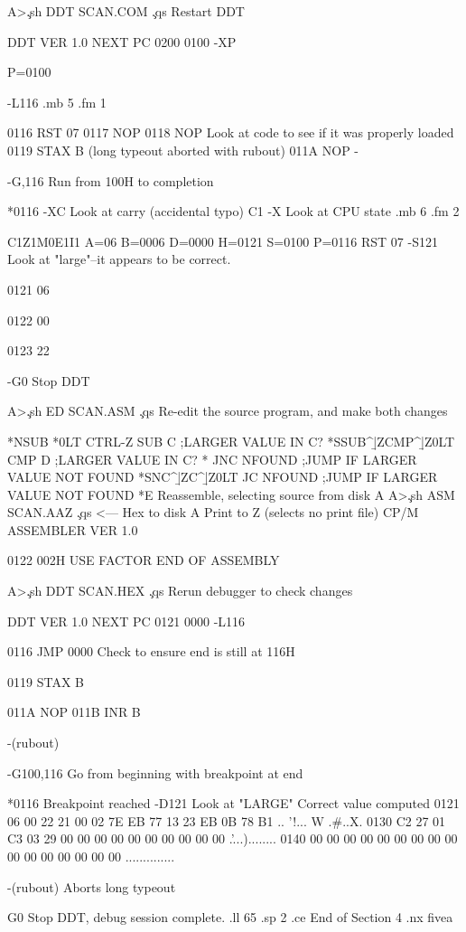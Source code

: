 A>\c
.sh
DDT SCAN.COM    \c
.qs
Restart DDT

DDT VER 1.0
NEXT PC
0200 0100
-XP

P=0100

-L116
.mb 5
.fm 1

 0116   RST        07
 0117   NOP
 0118   NOP               Look at code to see if it was properly loaded
 0119   STAX       B      (long typeout aborted with rubout)
 011A   NOP
 -

-G,116    Run from 100H to completion

*0116
-XC     Look at carry (accidental typo)
C1
-X   Look at CPU state
.mb 6
.fm 2

C1Z1M0E1I1 A=06 B=0006 D=0000 H=0121 S=0100 P=0116 RST 07
-S121   Look at "large"--it appears to be correct.

0121 06

0122 00

0123 22

-G0    Stop DDT

A>\c
.sh
ED SCAN.ASM    \c
.qs
Re-edit the source program, and make both changes

*NSUB
*0LT
     CTRL-Z        SUB     C           ;LARGER VALUE IN C?
*SSUB^\b|ZCMP^\b|Z0LT
                   CMP     D           ;LARGER VALUE IN C?
*
                   JNC     NFOUND      ;JUMP IF LARGER VALUE NOT FOUND
*SNC^\b|ZC^\b|Z0LT
                   JC      NFOUND      ;JUMP IF LARGER VALUE NOT FOUND
*E
                      Reassemble, selecting source from disk A
A>\c
.sh
ASM SCAN.AAZ   \c
.qs
<--- Hex to disk A
                      Print to Z (selects no print file)
CP/M ASSEMBLER    VER 1.0

0122
002H USE FACTOR
END OF ASSEMBLY

A>\c
.sh
DDT SCAN.HEX    \c
.qs
Rerun debugger to check changes

DDT VER 1.0
NEXT PC
0121 0000
-L116

 0116   JMP        0000     Check to ensure end is still at 116H

 0119   STAX       B

 011A   NOP
 011B   INR        B

 -(rubout)

-G100,116    Go from beginning with breakpoint at end

*0116    Breakpoint reached
-D121    Look at "LARGE"
                      Correct value computed
0121 06 00 22 21 00 02 7E EB 77 13 23 EB 0B 78 B1 .. '!... W .#..X.
0130 C2 27 01 C3 03 29 00 00 00 00 00 00 00 00 00 00 .'...)........
0140 00 00 00 00 00 00 00 00 00 00 00 00 00 00 00 00 ..............

-(rubout) Aborts long typeout

G0    Stop DDT, debug session complete.
.ll 65
.sp 2
.ce
End of Section 4
.nx fivea
